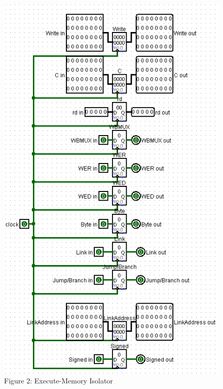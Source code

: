 \documentclass{article}
\begin{document}
\begin{figure}
\vspace{-1.7cm}
\begin{center}
\includegraphics[scale=0.55]{isolator34.png} \\
Figure 2: Execute-Memory Isolator
\end{center}
\vspace{-1.5cm}
\end{figure}
\vspace{-0.7cm}
\end{document}
